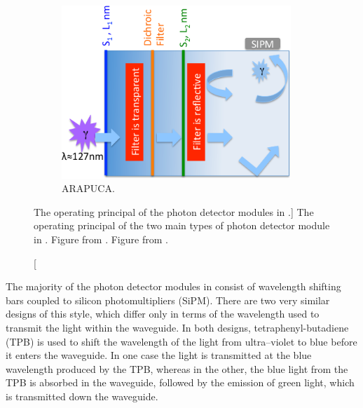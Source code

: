 \begin{figure}
\begin{subfigure}[b]{0.69\textwidth}
		\includegraphics[width=0.95\textwidth]{figures/pdsp_arapuca.png}
		\caption{ARAPUCA.}
		\label{fig:arapuca}
	\end{subfigure}

	\caption
	[The operating principal of the photon detector modules in \protodune{}.]
	{The operating principal of the two main types of photon detector module in 
	\protodune{}. Figure  from \cite{Abi:2017aow}. Figure 
	 from \cite{Machado:2016jqe}.}

	\label{fig:pdsp_pd}

\end{figure}

The majority of the photon detector modules in \protodune{} consist of 
wavelength shifting bars coupled to silicon photomultipliers (SiPM). There are 
two very similar designs of this style, which differ only in terms of the 
wavelength used to transmit the light within the waveguide. In both designs, 
tetraphenyl-butadiene (TPB) is used to shift the wavelength of the light from 
ultra--violet to blue before it enters the waveguide. In one case the 
light is transmitted at the blue wavelength produced by the TPB, whereas 
in the other, the blue light from the TPB is absorbed in the waveguide, followed
by the emission of green light, which is transmitted down the waveguide.

